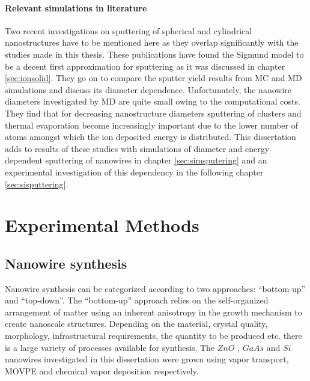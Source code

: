 \subsubsection{Relevant simulations in literature}

Two recent investigations on sputtering of spherical \cite{nietiadi_sputtering_2014} and cylindrical \cite{urbassek_sputter_2015} nanostructures have to be mentioned here as they overlap significantly with the studies made in this thesis. These publications have found the Sigmund model to be a decent first approximation for sputtering as it was discussed in chapter \ref{sec:ionsolid}. They go on to compare the sputter yield results from MC and MD simulations and discuss its diameter dependence. Unfortunately, the nanowire diameters investigated by MD are quite small owing to the computational costs. They find that for decreasing nanostructure diameters sputtering of clusters and thermal evaporation become increasingly important due to the lower number of atoms amongst which the ion deposited energy is distributed. This dissertation adds to results of these studies with simulations of diameter and energy dependent sputtering of nanowires in chapter \ref{sec:simsputering} and an experimental investigation of this dependency in the following chapter \ref{sec:sisputtering}.


\chapter{Experimental Methods}

\section{Nanowire synthesis}

Nanowire synthesis can be categorized according to two approaches: ``bottom-up'' and ``top-down''. The ``bottom-up'' approach relies on the self-organized arrangement of matter using an inherent anisotropy in the growth mechanism to create nanoscale structures. Depending on the material, crystal quality, morphology, infrastructural requirements, the quantity to be produced etc. there is a large variety of processes available for synthesis. The $ZnO$ \cite{borchers_catalyst_2006, stichtenoth_dimensionseffekte_2008, muller_structural_2009,ogrisek_kontrolliertes_2013}, $GaAs$ \cite{borgstrom_size-_2004, wacaser_preferential_2009} and $Si$ \cite{lugstein_pressure-induced_2008} nanowires investigated in this dissertation were grown using vapor transport, MOVPE and chemical vapor deposition respectively. 

